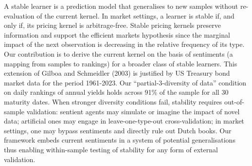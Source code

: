 %
%
%
%
%
  A stable learner is a prediction model that generalises to new samples
  without re-evaluation of the current kernel.  In market settings, a learner
  is stable if, and only if, its pricing kernel is arbitrage-free.  Stable
  pricing kernels preserve information and support the efficient markets
  hypothesis since the marginal impact of the next observation is decreasing in
  the relative frequency of its type. Our contribution is to derive the current
  kernel on the basis of sentiments (a mapping from samples to rankings) for a
  broader class of stable learners. This extension of Gilboa and Schmeidler
  (2003) is justified by US Treasury bond market data for the period 1961-2023.
  Our ``partial-3-diversity of data'' condition on daily rankings of annual
  yields holds across 91\% of the sample for all 30 maturity dates. When
  stronger diversity conditions fail, stability requires out-of-sample
  validation: sentient agents may simulate or imagine the impact of novel data;
  artificial ones may engage in leave-one-type-out cross-validation; in market
  settings, one may bypass sentiments and directly rule out Dutch books. Our
  framework embeds current sentiments in a system of potential generalisations
  thus enabling within-sample testing of stability for any form of external
  validation.
%
%
%
